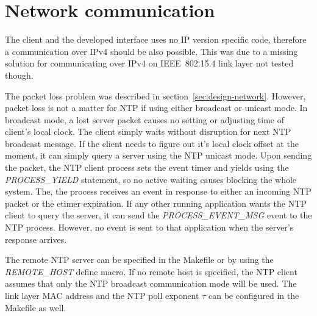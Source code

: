 
\section{Network communication}
The client and the developed interface uses no IP version specific code,
therefore a communication over IPv4 should be also possible.
This was due to a missing solution for
communicating over IPv4 on IEEE~802.15.4 link layer not tested though.

The packet loss problem was described in section~\ref{sec:design-network}.
However, packet loss is not a matter for NTP if using either broadcast or unicast mode.
In broadcast mode, a lost server packet causes no setting or adjusting time of client's
local clock.
The client simply waits without disruption for next NTP broadcast message.
If the client needs to figure out it's local clock offset at the moment,
it can simply query a server using the NTP unicast mode.
Upon sending the packet, the NTP client process sets the event timer and yields
using the {\it{PROCESS\_YIELD}} statement, so no active waiting
causes blocking the whole system.
The, the process receives an event in response to either an incoming NTP packet
or the etimer expiration.
If any other running application wants the NTP client to query the server,
it can send the {\it{PROCESS\_EVENT\_MSG}} event to the NTP process.
However, no event is sent to that application when the server's response arrives.

The remote NTP server can be specified in the Makefile or
by using the {\it{REMOTE\_HOST}} define macro.
If no remote host is specified, the NTP client assumes that only the NTP broadcast communication mode will be used.
The link layer MAC address and the NTP poll exponent $\tau$
can be configured in the Makefile as well.



